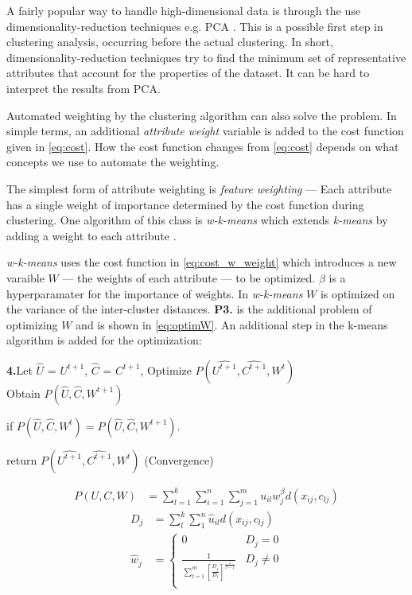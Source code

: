 \documentclass[../report.tex]{subfiles}
\begin{document}
A fairly popular way to handle high-dimensional data is through the use dimensionality-reduction techniques e.g. PCA \cite{Jolliffe2005,van2009}. This is a possible first step in clustering analysis, occurring before the actual clustering. In short, dimensionality-reduction techniques try to find the minimum set of representative attributes that account for the properties of the dataset. It can be hard to interpret the results from PCA.

Automated weighting by the clustering algorithm can also solve the problem. In simple terms, an additional \textit{attribute weight} variable is added to the cost function given in \ref{eq:cost}. How the cost function changes from \ref{eq:cost} depends on what concepts we use to automate the weighting.

The simplest form of attribute weighting is \textit{feature weighting} --- Each attribute has a single weight of importance determined by the cost function during clustering. One algorithm of this class is \textit{w-k-means} which extends \textit{k-means} by adding a weight to each attribute \cite{huang2005automated}.


\textit{w-k-means} uses the cost function in \ref{eq:cost_w_weight} which introduces a new varaible $W$ --- the weights of each attribute --- to be optimized. $\beta$ is a hyperparamater for the importance of weights. In \textit{w-k-means} $W$ is optimized on the variance of the inter-cluster distances. \textbf{P3.} is the additional problem of optimizing $W$ and is shown in \ref{eq:optimW}. An additional step in the k-means algorithm is added for the optimization:

\textbf{4.}\quad Let $\hat{U}$ = $U^{t+1}$, $\hat{C}$ = $C^{t+1}$, Optimize $P(\hat{U^{t+1}}, \hat{ C^{t + 1} }, W^{t})$ \\
\quad  Obtain $P(\hat{U}, \hat{ C }, W^{t + 1})$
\begin{description}
  \item if $P(\hat{U}, \hat{ C }, W^{t}) = P(\hat{U}, \hat{ C }, W^{t + 1})$.

  \item \quad return $P(\hat{U^{t+1}}, \hat{ C^{t + 1} }, W^{t})$ (Convergence)
\end{description}

\begin{align}
  \label{eq:cost_w_weight}
  P(U,C,W) &= \sum^k_{l=1} \sum^n_{i=1} \sum^m_{j=1} u_{il} w_j^{\beta} d(x_{ij},c_{lj})
\end{align}
\begin{align}
D_j &= \sum^{ k }_{ l }{\sum^n_1 {\hat{u}_{il} d(x_{ ij }, c_ { lj } )}} \\
\label{eq:optimW}
\hat{w}_j &=
\begin{cases}
  0 & D_j = 0 \\
  \frac{1}{ \sum^m_{t=1} [\frac{ D_j }{ D_t }]^{ \frac{ 1 }{ \beta - 1 } } } & D_j \neq 0 \\
\end{cases}
\end{align}
\end{document}
